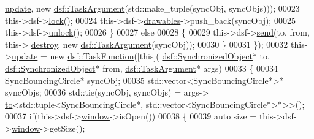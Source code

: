 \begin{DoxyCode}
      \hyperlink{class_bouncing_circle_manager_a40c60a1170ab1528bf67c86bcc2d7637}{update}, \textcolor{keyword}{new} \hyperlink{classyc_1_1_any}{dsf::TaskArgument}(std::make\_tuple(syncObj, syncObjs)));
00023                                                  this->dsf->\hyperlink{classdsf_1_1_lock_ae521388d861fe66b9c6e2f09811b0d4b}{lock}();
00024                                                  this->dsf->\hyperlink{classdsf_1_1sfml_1_1_render_window_a745350dfdb1f752359f9055d714c453d}{drawables}->push\_back(syncObj);
00025                                                  this->dsf->\hyperlink{classdsf_1_1_lock_a3d03f801920d458b3c3c402a0f4af323}{unlock}();
00026                                              \}
00027                                              \textcolor{keywordflow}{else}
00028                                              \{
00029                                                  this->dsf->\hyperlink{classdsf_1_1_dual_state_framework_a3063d7f0ce537eb44dc2bdcec816a36b}{send}(to, from, this->
      \hyperlink{class_bouncing_circle_manager_aee82e3ddd983f4e27c439b74494ab3d5}{destroy}, \textcolor{keyword}{new} \hyperlink{classyc_1_1_any}{dsf::TaskArgument}(syncObj));
00030                                              \}
00031                                          \});
00032     this->\hyperlink{class_bouncing_circle_manager_a40c60a1170ab1528bf67c86bcc2d7637}{update} = \textcolor{keyword}{new} \hyperlink{namespacedsf_aa16e735f29587f4485b56fc46746f7a9}{dsf::TaskFunction}([\textcolor{keyword}{this}](
      \hyperlink{classdsf_1_1_synchronized_object}{dsf::SynchronizedObject}* to, \hyperlink{classdsf_1_1_synchronized_object}{dsf::SynchronizedObject}* from, 
      \hyperlink{classyc_1_1_any}{dsf::TaskArgument}* args)
00033                                          \{
00034                                              \hyperlink{class_sync_bouncing_circle}{SyncBouncingCircle}* syncObj;
00035                                              std::vector<SyncBouncingCircle*>* syncObjs;
00036                                              std::tie(syncObj, syncObjs) = args->
      \hyperlink{classyc_1_1_any_a3db663604505ef8d7e84dd41d5bfcc75}{to}<std::tuple<SyncBouncingCircle*, std::vector<SyncBouncingCircle*>*>>();
00037                                              \textcolor{keywordflow}{if}(this->dsf->\hyperlink{classdsf_1_1sfml_1_1_render_window_a2c04b61ca1bfba140120001c4a9a30e1}{window}->isOpen())
00038                                              \{
00039                                                  \textcolor{keyword}{auto} size = this->dsf->\hyperlink{classdsf_1_1sfml_1_1_render_window_a2c04b61ca1bfba140120001c4a9a30e1}{window}->getSize();

\end{DoxyCode}
